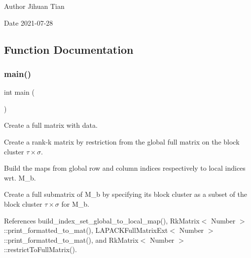 \begin{DoxyAuthor}{Author}
Jihuan Tian 
\end{DoxyAuthor}
\begin{DoxyDate}{Date}
2021-\/07-\/28 
\end{DoxyDate}


\subsection{Function Documentation}
\mbox{\label{rkmatrix-local-to-submatrix_8cc_ae66f6b31b5ad750f1fe042a706a4e3d4}} 
\subsubsection{\texorpdfstring{main()}{main()}}
{\footnotesize\ttfamily int main (\begin{DoxyParamCaption}{ }\end{DoxyParamCaption})}

Create a full matrix with data.

Create a rank-\/k matrix by restriction from the global full matrix on the block cluster $\tau \times \sigma$.

Build the maps from global row and column indices respectively to local indices wrt. M\+\_\+b.

Create a full submatrix of {\ttfamily M\+\_\+b} by specifying its block cluster as a subset of the block cluster $\tau \times \sigma$ for {\ttfamily M\+\_\+b}.

References build\+\_\+index\+\_\+set\+\_\+global\+\_\+to\+\_\+local\+\_\+map(), Rk\+Matrix$<$ Number $>$\+::print\+\_\+formatted\+\_\+to\+\_\+mat(), L\+A\+P\+A\+C\+K\+Full\+Matrix\+Ext$<$ Number $>$\+::print\+\_\+formatted\+\_\+to\+\_\+mat(), and Rk\+Matrix$<$ Number $>$\+::restrict\+To\+Full\+Matrix().


